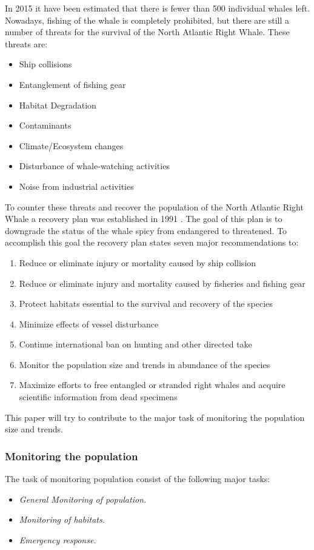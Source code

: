 In 2015 it have been estimated that there is fewer than 500 individual whales left. Nowadays, fishing of the whale is completely prohibited, but there are still a number of threats for the survival of the North Atlantic Right Whale.
These threats are:
\begin{itemize}
\item Ship collisions 
\item Entanglement of fishing gear
\item Habitat Degradation 
\item Contaminants
\item Climate/Ecosystem changes
\item Disturbance of whale-watching activities
\item Noise from industrial activities
\end{itemize}
To counter these threats and recover the population of the North Atlantic Right Whale a recovery plan was established in 1991 \cite{NOAARecovery}. 
The goal of this plan is to downgrade the status of the whale spicy from endangered to threatened.
To accomplish this goal the recovery plan states seven major recommendations to:
\begin{enumerate}
\item Reduce or eliminate injury or mortality caused by ship collision
\item Reduce or eliminate injury and mortality caused by fisheries and fishing gear
\item Protect habitats essential to the survival and recovery of the species
\item Minimize effects of vessel disturbance
\item Continue international ban on hunting and other directed take
\item Monitor the population size and trends in abundance of the species
\item Maximize efforts to free entangled or stranded right whales and acquire scientific information from dead specimens
\end{enumerate} 
This paper will try to contribute to the major task of monitoring the population size and trends. 



\subsubsection{Monitoring the population}


The task of monitoring population consist of the following major tasks:
\begin{itemize}
\item \textit{General Monitoring of population.}
\item \textit{Monitoring of habitats.}
\item \textit{Emergency response.}
\end{itemize}

